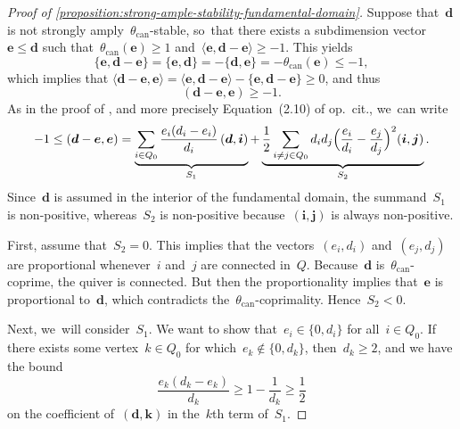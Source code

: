 \documentclass[11pt]{article}
\theoremstyle{plain}
\theoremstyle{definition}
\newcommand\can{\ensuremath{\mathrm{can}}}
\newcommand\tuple[1]{\ensuremath{{\boldsymbol{#1}}}}
\begin{document}
\begin{proof}[Proof of \cref{proposition:strong-ample-stability-fundamental-domain}]
Suppose that~$\tuple{d}$ is not strongly amply~$\theta_\can$-stable, so~that
there exists a subdimension vector~$\tuple{e}\leq\tuple{d}$
such that~$\theta_\can(\tuple{e})\geq 1$
and~$\langle\tuple{e},\tuple{d}-\tuple{e}\rangle\geq-1$.
This yields
\begin{equation*}
\{\tuple{e},\tuple{d}-\tuple{e}\}
=\{\tuple{e},\tuple{d}\}
=-\{\tuple{d},\tuple{e}\}
=-\theta_\can(\tuple{e})\leq-1,
\end{equation*}
which implies that
$\langle\tuple{d}-\tuple{e},\tuple{e}\rangle
=\langle\tuple{e},\tuple{d}-\tuple{e}\rangle-\{\tuple{e},\tuple{d}-\tuple{e}\}
\geq0$,
and thus
\begin{equation*}
(\tuple{d}-\tuple{e},\tuple{e})\geq-1.
\end{equation*}
As in the proof of \cite[Lem.\,2.15]{MR0557581},
and more precisely Equation~(2.10) of op.~cit., we~can write
\begin{equation}
\label{equation:kac-inequality}
-1
\leq({\tuple{d}}-{\tuple{e}},{\tuple{e}})
=\underbrace{\sum_{i\in Q_0}\frac{e_i(d_i-e_i)}{d_i}\,({\tuple{d}},{\tuple{i}})}_{S_1}
+\underbrace{\frac{1}{2}\sum_{i\neq j\in Q_0}d_id_j\Bigl( \frac{e_i}{d_i}-\frac{e_j}{d_j} \Bigr)^2({\tuple{i}},{\tuple{j}})}_{S_2}.
\end{equation}
Since~$\tuple{d}$ is assumed in the interior of the fundamental domain,
the summand~$S_1$ is non-positive,
whereas~$S_2$ is non-positive because~$(\tuple{i},\tuple{j})$ is always non-positive.

First, assume that~$S_2=0$.
This implies that the vectors~$(e_i,d_i)$ and~$(e_j,d_j)$ are proportional
whenever~$i$ and~$j$ are connected in~$Q$.
Because~$\tuple{d}$ is~$\theta_\can$-coprime, the quiver is connected.
But then the proportionality implies that~$\tuple{e}$ is proportional to~$\tuple{d}$,
which contradicts the~$\theta_\can$-coprimality.
Hence~$S_2<0$.

Next, we~will consider~$S_1$.
We want to show that~$e_i \in \{0,d_i\}$ for all~$i\in Q_0$.
If there exists some vertex~$k\in Q_0$
for which~$e_k\not\in\{0,d_k\}$,
then~$d_k\geq 2$,
and we have the bound
\begin{equation}
\label{equation:two-inequalities}
\frac{e_k(d_k-e_k)}{d_k}\geq 1-\frac{1}{d_k}\geq\frac{1}{2}
\end{equation}
on the coefficient of~$(\tuple{d},\tuple{k})$ in the~$k$th term of~$S_1$.


\end{proof}
\end{document}
